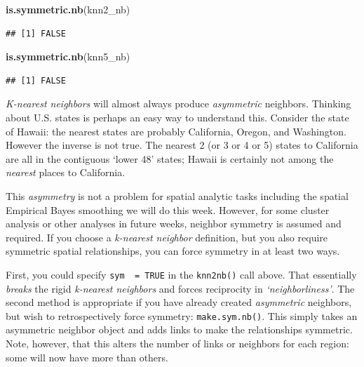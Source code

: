 \documentclass[
]{book}
\newenvironment{Shaded}{\begin{snugshade}}{\end{snugshade}}
\newcommand{\FunctionTok}[1]{\textcolor[rgb]{0.13,0.29,0.53}{\textbf{#1}}}
\newcommand{\NormalTok}[1]{#1}
\newenvironment{rmdnote}[1]
  {
  \begin{itemize}
  \renewcommand{\labelitemi}{
    \raisebox{-.7\height}[0pt][0pt]{
      {\setkeys{Gin}{width=3em,keepaspectratio}\texttt{[image: images/\#1]}}
    }
  }
  \setlength{\fboxsep}{1em}
  \begin{note}
  \item
  }
  {
  \end{note}
  \end{itemize}
  }
\begin{document}
\begin{Shaded}
\begin{Highlighting}[]
\FunctionTok{is.symmetric.nb}\NormalTok{(knn2\_nb)}
\end{Highlighting}
\end{Shaded}

\begin{verbatim}
## [1] FALSE
\end{verbatim}

\begin{Shaded}
\begin{Highlighting}[]
\FunctionTok{is.symmetric.nb}\NormalTok{(knn5\_nb)}
\end{Highlighting}
\end{Shaded}

\begin{verbatim}
## [1] FALSE
\end{verbatim}

\begin{rmdnote}{note}
\emph{K-nearest neighbors} will almost always produce \emph{asymmetric} neighbors. Thinking about U.S. states is perhaps an easy way to understand this. Consider the state of Hawaii: the nearest states are probably California, Oregon, and Washington. However the inverse is not true. The nearest 2 (or 3 or 4 or 5) states to California are all in the contiguous `lower 48' states; Hawaii is certainly not among the \emph{nearest} places to California.

\end{rmdnote}

This \emph{asymmetry} is not a problem for spatial analytic tasks including the spatial Empirical Bayes smoothing we will do this week. However, for some cluster analysis or other analyses in future weeks, neighbor symmetry is assumed and required. If you choose a \emph{k-nearest neighbor} definition, but you also require symmetric spatial relationships, you can force symmetry in at least two ways.

First, you could specify \texttt{sym\ \ =\ TRUE} in the \texttt{knn2nb()} call above. That essentially \emph{breaks} the rigid \emph{k-nearest neighbors} and forces reciprocity in \emph{`neighborliness'}. The second method is appropriate if you have already created \emph{asymmetric} neighbors, but wish to retrospectively force symmetry: \texttt{make.sym.nb()}. This simply takes an asymmetric neighbor object and adds links to make the relationships symmetric. Note, however, that this alters the number of links or neighbors for each region: some will now have more than others.
\end{document}
